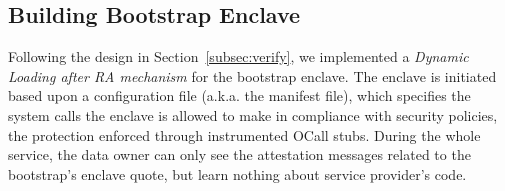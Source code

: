 





\subsection{Building Bootstrap Enclave}\label{subsec:bootstrap-impl}
%
Following the design in Section~\ref{subsec:verify}, we implemented a \textit{Dynamic Loading after RA mechanism} for the bootstrap enclave. The enclave is initiated based upon a configuration file (a.k.a. the manifest file), which specifies the system calls the enclave is allowed to make in compliance with security policies, the protection enforced through instrumented OCall stubs. During the whole service, the data owner can only see the attestation messages related to the bootstrap's enclave quote, but learn nothing about service provider’s code.




